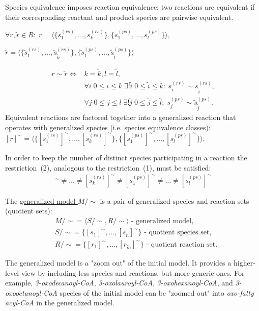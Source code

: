 \documentclass[10pt]{bmc_article}
\newenvironment{bmcformat}{\baselineskip20pt\sloppy\setboolean{publ}{false}}{\baselineskip20pt\sloppy}
\begin{document}
\begin{bmcformat}
Species equivalence imposes reaction equivalence: two reactions are equivalent if their corresponding reactant and product species are pairwise equivalent.
\begin{center}
$\forall r, \tilde{r} \in R:\; r = \langle\{s^{(rs)}_1, \ldots, s^{(rs)}_k\},\{s^{(ps)}_1, \ldots, s^{(ps)}_l\}\rangle,$
\end{center}
\begin{center}
$\tilde{r} = \langle\{\tilde{s}^{(rs)}_1, \ldots, \tilde{s}^{(rs)}_{\tilde{k}}\},\{\tilde{s}^{(ps)}_1, \ldots, \tilde{s}^{(ps)}_{\tilde{l}}\}\rangle$
\end{center}
\begin{align*} 
r \sim \tilde{r} \iff & k = \tilde{k}, l = \tilde{l}, \\
& \forall i\; 0\leq{i}\leq{k} \; \exists{!} \tilde{i}\; 0\leq \tilde{i}\leq \tilde{k}:\; s^{(rs)}_i \sim \tilde{s}^{(rs)}_{\tilde{i}},\\
& \forall j\;0\leq j\leq l\;\exists{!} \tilde{j}\;0\leq \tilde{j}\leq\tilde{l}:\;s^{(ps)}_j \sim \tilde{s}^{(ps)}_{\tilde{j}}.
\end{align*}
Equivalent reactions are factored together into a generalized reaction that operates with generalized species (i.e. species equivalence classes): 
$[r]^{\sim} = \langle\{[s^{(rs)}_1]^{\sim}, \ldots, [s^{(rs)}_k]^{\sim}\}, \{[s^{(ps)}_1]^{\sim}, \ldots, [s^{(ps)}_l]^{\sim}\}\rangle$.

In order to keep the number of distinct species participating in a reaction the restriction~(2), analogous to the restriction~(1), must be satisfied:
\begin{align}
[s^{(rs)}_1]^{\sim} \neq \ldots \neq [s^{(rs)}_k]^{\sim} \neq [s^{(ps)}_1]^{\sim} \neq \ldots \neq [s^{(ps)}_l]^{\sim}
\end{align}

The \underline{generalized model $M/\sim$} is a pair of generalized species and reaction sets (quotient sets):
\begin{align*} 
&M/\sim = \langle S/\sim, R/\sim \rangle\text{ - generalized model},\\
&S/\sim = \{[s_1]^{\sim}, \ldots, [s_{\tilde{n}}]^{\sim}\}\text{ - quotient species set},\\
&R/\sim = \{[r_1]^{\sim}, \ldots, [r_{\tilde{m}}]^{\sim}\}\text{ - quotient reaction set}.
\end{align*}

The generalized model is a "zoom out" of the initial model. It provides a higher-level view by including less species and reactions, but more generic ones. For example, \textit{3-oxodecanoyl-CoA}, \textit{3-oxolauroyl-CoA}, \textit{3-oxohexanoyl-CoA}, and \textit{3-oxooctanoyl-CoA} species of the initial model can be "zoomed out" into \textit{oxo-fatty acyl-CoA} in the generalized model. 


\end{bmcformat}
\end{document}
